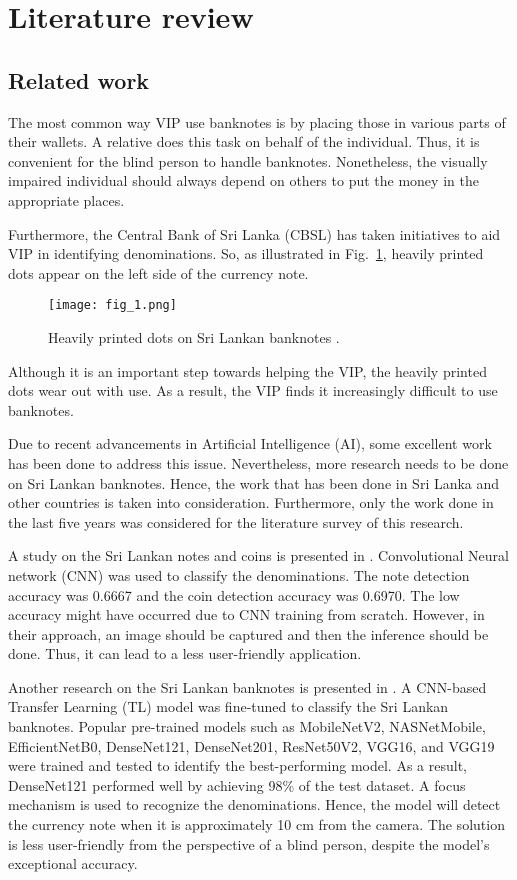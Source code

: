 \section{Literature review}
\subsection{Related work}
The most common way VIP use banknotes is by placing those in various parts of their wallets. A relative does this task on behalf of the individual. Thus, it is convenient for the blind person to handle banknotes. Nonetheless, the visually impaired individual should always depend on others to put the money in the appropriate places.

Furthermore, the Central Bank of Sri Lanka (CBSL) has taken initiatives to aid VIP in identifying denominations. So, as illustrated in Fig.~\ref{fig:my_image_1}, heavily printed dots appear on the left side of the currency note.
\begin{figure}[htbp]
    \centerline{\texttt{[image: fig\_1.png]}}
    \caption{Heavily printed dots on Sri Lankan banknotes \cite{b5}.}
    \label{fig:my_image_1}
\end{figure}

Although it is an important step towards helping the VIP, the heavily printed dots wear out with use. As a result, the VIP finds it increasingly difficult to use banknotes.

Due to recent advancements in Artificial Intelligence (AI), some excellent work has been done to address this issue. Nevertheless, more research needs to be done on Sri Lankan banknotes. Hence, the work that has been done in Sri Lanka and other countries is taken into consideration. Furthermore, only the work done in the last five years was considered for the literature survey of this research.

A study on the Sri Lankan notes and coins is presented in \cite{b6}. Convolutional Neural network (CNN) was used to classify the denominations. The note detection accuracy was 0.6667 and the coin detection accuracy was 0.6970. The low accuracy might have occurred due to CNN training from scratch. However, in their approach, an image should be captured and then the inference should be done. Thus, it can lead to a less user-friendly application.

Another research on the Sri Lankan banknotes is presented in \cite{b7}. A CNN-based Transfer Learning (TL) model was fine-tuned to classify the Sri Lankan banknotes. Popular pre-trained models such as MobileNetV2, NASNetMobile, EfficientNetB0, DenseNet121, DenseNet201, ResNet50V2, VGG16, and VGG19 were trained and tested to identify the best-performing model. As a result, DenseNet121 performed well by achieving 98\% of the test dataset. A focus mechanism is used to recognize the denominations. Hence, the model will detect the currency note when it is approximately 10 cm from the camera. The solution is less user-friendly from the perspective of a blind person, despite the model's exceptional accuracy.

